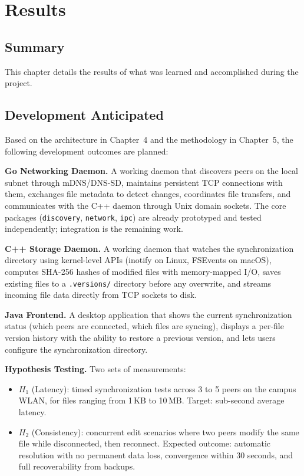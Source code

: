 \chapter{Results}

\section*{Summary}
This chapter details the results of what was learned and accomplished during the project.

\section{Development Anticipated}
\label{sec:results-anticipated}

Based on the architecture in Chapter~4 and the methodology in Chapter~5, the following development outcomes are planned:

\textbf{Go Networking Daemon.} A working daemon that discovers peers on the local subnet through mDNS/DNS-SD, maintains persistent TCP connections with them, exchanges file metadata to detect changes, coordinates file transfers, and communicates with the C++ daemon through Unix domain sockets. The core packages (\texttt{discovery}, \texttt{network}, \texttt{ipc}) are already prototyped and tested independently; integration is the remaining work.

\textbf{C++ Storage Daemon.} A working daemon that watches the synchronization directory using kernel-level APIs (inotify on Linux, FSEvents on macOS), computes SHA-256 hashes of modified files with memory-mapped I/O, saves existing files to a \texttt{.versions/} directory before any overwrite, and streams incoming file data directly from TCP sockets to disk.

\textbf{Java Frontend.} A desktop application that shows the current synchronization status (which peers are connected, which files are syncing), displays a per-file version history with the ability to restore a previous version, and lets users configure the synchronization directory.

\textbf{Hypothesis Testing.} Two sets of measurements:
\begin{itemize}
    \item $H_1$ (Latency): timed synchronization tests across 3 to 5 peers on the campus WLAN, for files ranging from 1\,KB to 10\,MB. Target: sub-second average latency.
    \item $H_2$ (Consistency): concurrent edit scenarios where two peers modify the same file while disconnected, then reconnect. Expected outcome: automatic resolution with no permanent data loss, convergence within 30 seconds, and full recoverability from backups.
\end{itemize}


